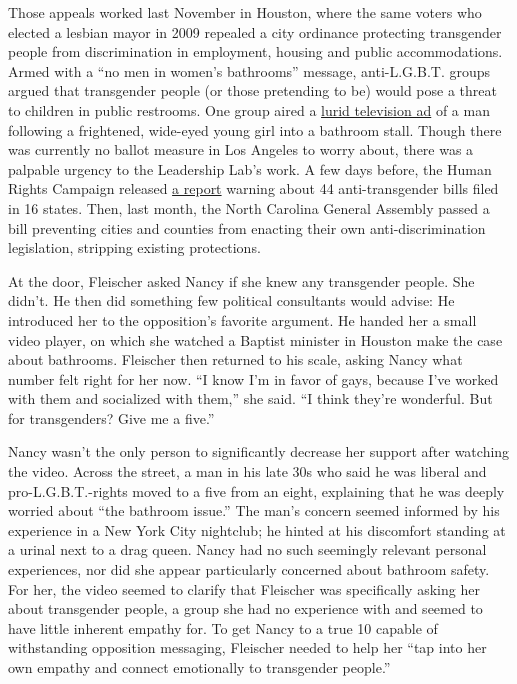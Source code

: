 Those appeals worked last November in Houston, where the same voters who
elected a lesbian mayor in 2009 repealed a city ordinance protecting
transgender people from discrimination in employment, housing and public
accommodations. Armed with a ``no men in women's bathrooms'' message,
anti-L.G.B.T. groups argued that transgender people (or those pretending
to be) would pose a threat to children in public restrooms. One group
aired a \href{https://www.youtube.com/watch?v=D7thOvSvC4E}{lurid
television ad} of a man following a frightened, wide-eyed young girl
into a bathroom stall. Though there was currently no ballot measure in
Los Angeles to worry about, there was a palpable urgency to the
Leadership Lab's work. A few days before, the Human Rights Campaign
released
\href{http://hrc-assets.s3-website-us-east-1.amazonaws.com//files/assets/resources/HRC-Anti-Trans-Issue-Brief-FINAL-REV2.pdf}{a
report} warning about 44 anti-transgender bills filed in 16 states.
Then, last month, the North Carolina General Assembly passed a bill
preventing cities and counties from enacting their own
anti-discrimination legislation, stripping existing protections.

At the door, Fleischer asked Nancy if she knew any transgender people.
She didn't. He then did something few political consultants would
advise: He introduced her to the opposition's favorite argument. He
handed her a small video player, on which she watched a Baptist minister
in Houston make the case about bathrooms. Fleischer then returned to his
scale, asking Nancy what number felt right for her now. ``I know I'm in
favor of gays, because I've worked with them and socialized with them,''
she said. ``I think they're wonderful. But for transgenders? Give me a
five.''

Nancy wasn't the only person to significantly decrease her support after
watching the video. Across the street, a man in his late 30s who said he
was liberal and pro-L.G.B.T.-rights moved to a five from an eight,
explaining that he was deeply worried about ``the bathroom issue.'' The
man's concern seemed informed by his experience in a New York City
nightclub; he hinted at his discomfort standing at a urinal next to a
drag queen. Nancy had no such seemingly relevant personal experiences,
nor did she appear particularly concerned about bathroom safety. For
her, the video seemed to clarify that Fleischer was specifically asking
her about transgender people, a group she had no experience with and
seemed to have little inherent empathy for. To get Nancy to a true 10
capable of withstanding opposition messaging, Fleischer needed to help
her ``tap into her own empathy and connect emotionally to transgender
people.''

